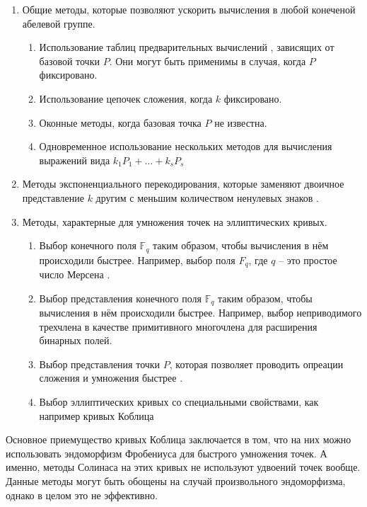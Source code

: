 \documentclass[a4paper,12pt]{article}
\theoremstyle{definition}
\theoremstyle{underline}
\begin{document}
	\begin{enumerate}
		\item Общие методы, которые позволяют ускорить вычисления в любой конеченой абелевой группе.
			\begin{enumerate}
				\item Использование таблиц предварительных вычислений \cite{lim1994more}, зависящих от базовой точки $P$. Они могут быть применимы в случая, когда $P$ фиксировано.
				\item Использование цепочек сложения, когда $k$ фиксировано.
				\item Оконные методы, когда базовая точка $P$ не известна.
				\item Одновременное использование нескольких методов для вычисления выражений вида $k_1 P_1 + \ldots + k_s P_s$
			\end{enumerate}

		\item Методы экспоненциального перекодирования, которые заменяют двоичное представление $k$ другим с меньшим количеством ненулевых знаков \cite{gollmann1996redundant}.
		
		\item Методы, характерные для умножения точек на эллиптических кривых.
			\begin{enumerate}
				\item Выбор конечного поля $\mathbb{F}_q$ таким образом, чтобы вычисления в нём происходили быстрее. Например, выбор поля $F_q$, где $q$ -- это простое число Мерсена \cite{solinas1999generalized}.
				\item Выбор представления конечного поля $\mathbb{F}_q$ таким образом, чтобы вычисления в нём происходили быстрее. Например, выбор неприводимого трехчлена в качестве примитивного многочлена для расширения бинарных полей.
				\item Выбор представления точки $P$, которая позволяет проводить опреации сложения и умножения быстрее \cite{cohen1998efficient}.
				\item Выбор эллиптических кривых со специальными свойствами, как например кривых Коблица \cite{koblitz1991cm}
			\end{enumerate}
	\end{enumerate}

	Основное приемущество кривых Коблица заключается в том, что на них можно использовать эндоморфизм Фробениуса для быстрого умножения точек. А именно, методы Солинаса \cite{solinas1997improved, solinas2000efficient} на этих кривых не используют удвоений точек вообще. Данные методы могут быть обощены на случай произвольного эндоморфизма, однако в целом это не эффективно.
	
\end{document}
